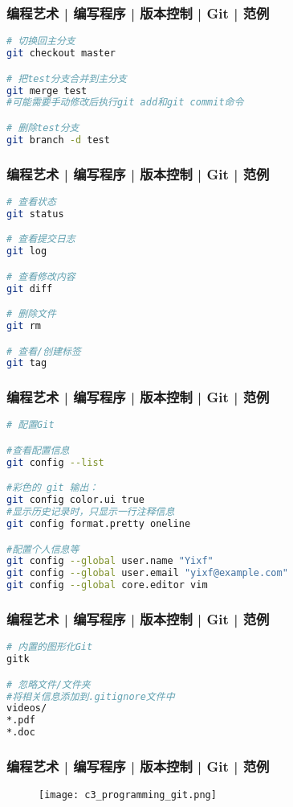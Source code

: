 \begin{frame}[fragile]
  \frametitle{编程艺术 | 编写程序 | 版本控制 | Git | \alert{范例}}
\begin{lstlisting}[language=sh]
# 切换回主分支
git checkout master

# 把test分支合并到主分支
git merge test
#可能需要手动修改后执行git add和git commit命令

# 删除test分支
git branch -d test
\end{lstlisting}
\end{frame}

\begin{frame}[fragile]
  \frametitle{编程艺术 | 编写程序 | 版本控制 | Git | \alert{范例}}
\begin{lstlisting}[language=sh]
# 查看状态
git status

# 查看提交日志
git log

# 查看修改内容
git diff

# 删除文件
git rm

# 查看/创建标签
git tag
\end{lstlisting}
\end{frame}

\begin{frame}[fragile]
  \frametitle{编程艺术 | 编写程序 | 版本控制 | Git | 范例}
\begin{lstlisting}[language=sh]
# 配置Git

#查看配置信息
git config --list

#彩色的 git 输出：
git config color.ui true
#显示历史记录时，只显示一行注释信息
git config format.pretty oneline

#配置个人信息等
git config --global user.name "Yixf"
git config --global user.email "yixf@example.com"
git config --global core.editor vim
\end{lstlisting}
\end{frame}

\begin{frame}[fragile]
  \frametitle{编程艺术 | 编写程序 | 版本控制 | Git | 范例}
\begin{lstlisting}[language=sh]
# 内置的图形化Git
gitk

# 忽略文件/文件夹
#将相关信息添加到.gitignore文件中
videos/
*.pdf
*.doc
\end{lstlisting}
\end{frame}

\begin{frame}
  \frametitle{编程艺术 | 编写程序 | 版本控制 | Git | \alert{范例}}
  \begin{figure}
    \centering
    \texttt{[image: c3\_programming\_git.png]}
  \end{figure}
\end{frame}

